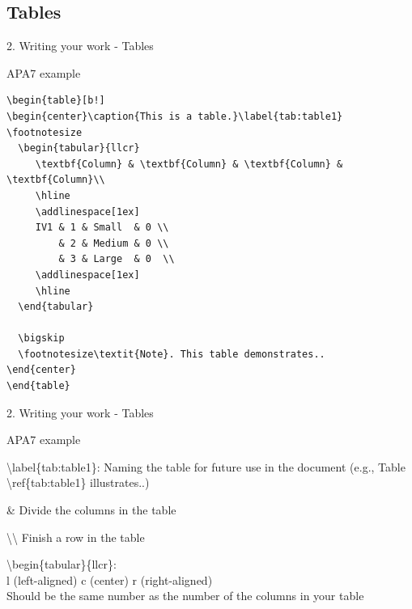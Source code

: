 \documentclass[13pt]{beamer}
\newcommand{\itemA}{\item[\textcolor{black}{\textbullet}]}
\newcommand{\itemB}{\item[\textcolor{black}{\textopenbullet}]}
\newcommand{\green}{\textcolor{colorgreen}}
\begin{document}
\subsection{Tables}
\begin{frame}[fragile]{2. Writing your work - Tables}
\begin{fullpageitemize}
\itemA APA7 example
{\scriptsize
\begin{verbatim}
\begin{table}[b!]
\begin{center}\caption{This is a table.}\label{tab:table1}
\footnotesize
  \begin{tabular}{llcr}
     \textbf{Column} & \textbf{Column} & \textbf{Column} & \textbf{Column}\\      
     \hline
     \addlinespace[1ex]
     IV1 & 1 & Small  & 0 \\
         & 2 & Medium & 0 \\
         & 3 & Large  & 0  \\
     \addlinespace[1ex]
     \hline
  \end{tabular}

  \bigskip
  \footnotesize\textit{Note}. This table demonstrates..
\end{center}
\end{table}
\end{verbatim}
}
\end{fullpageitemize}
\end{frame}

\begin{frame}[fragile]{2. Writing your work - Tables}
\begin{fullpageitemize}
\itemA APA7 example \hfill \break
\begin{fullpageitemize}
    \itemB \green{\textbackslash label\{tab:table1\}}: Naming the table for future use in the document (e.g., Table \green{\textbackslash ref\{tab:table1\}} illustrates..) 
    \itemB \green{\&} Divide the columns in the table
    \itemB \green{\textbackslash \textbackslash} Finish a row in the table
    \itemB \green{\textbackslash begin\{tabular\}\{llcr\}}:\\ l (left-aligned) c (center) r (right-aligned)\\
    Should be the same number as the number of the columns in your table
    \end{fullpageitemize}
\end{fullpageitemize}
\end{frame}
\end{document}

